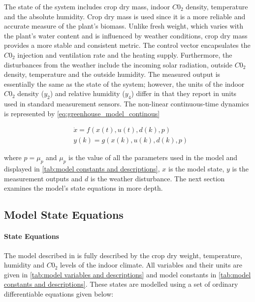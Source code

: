 The state of the system includes crop dry mass, indoor $C0_2$ density, temperature and the absolute humidity. Crop dry mass is used since it is a more reliable and accurate measure of the plant's biomass. Unlike fresh weight, which varies with the plant's water content and is influenced by weather conditions, crop dry mass provides a more stable and consistent metric. The control vector encapsulates the $C0_2$ injection and ventilation rate and the heating supply. Furthermore, the disturbances from the weather include the incoming solar radiation, outside $C0_2$ density, temperature and the outside humidity. The measured output is essentially the same as the state of the system; however, the units of the indoor $C0_2$ density ($y_2$) and relative humidity ($y_4$) differ in that they report in units used in standard measurement sensors. The non-linear continuous-time dynamics is represented by \autoref{eq:greenhouse_model_continous}

\begin{equation}\label{eq:greenhouse_model_continous}
	\begin{aligned}
		& \dot{x}= f(x(t),u(t),d(k),p) \\
		& y(k) = g(x(k),u(k),d(k),p)
	\end{aligned}
\end{equation}

where $p=\mu_p$ and $\mu_p$ is the value of all the parameters used in the model and displayed in \autoref{tab:model constants and descriptions}, $x$ is the model state, $y$ is the measurement outputs and $d$ is the weather disturbance. The next section examines the model's state equations in more depth.

\subsection {Model State Equations}

\paragraph{State Equations}
The model described in \cite{hentenGreenhouseClimateManagement1994} is fully described by the crop dry weight, temperature, humidity and $C0_2$ levels of the indoor climate. All variables and their units are given in \autoref{tab:model variables and descriptions} and model constants in \autoref{tab:model constants and descriptions}. These states are modelled using a set of ordinary differentiable equations given below:

